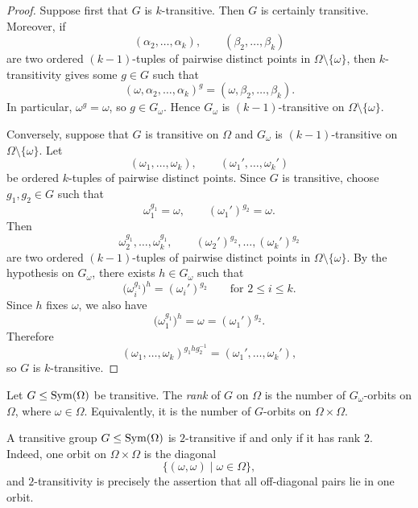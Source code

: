 \begin{proof}
Suppose first that \(G\) is \(k\)-transitive. Then \(G\) is certainly transitive.
Moreover, if
\[
    (\alpha_2,\ldots,\alpha_k),\qquad
    (\beta_2,\ldots,\beta_k)
\]
are two ordered \((k-1)\)-tuples of pairwise distinct points in
\(\Omega\setminus\{\omega\}\), then \(k\)-transitivity gives some \(g\in G\) such that
\[
    (\omega,\alpha_2,\ldots,\alpha_k)^g
    =
    (\omega,\beta_2,\ldots,\beta_k).
\]
In particular, \(\omega^g=\omega\), so \(g\in G_\omega\). Hence \(G_\omega\)
is \((k-1)\)-transitive on \(\Omega\setminus\{\omega\}\).

Conversely, suppose that \(G\) is transitive on \(\Omega\) and \(G_\omega\) is
\((k-1)\)-transitive on \(\Omega\setminus\{\omega\}\). Let
\[
    (\omega_1,\ldots,\omega_k),\qquad
    (\omega_1',\ldots,\omega_k')
\]
be ordered \(k\)-tuples of pairwise distinct points. Since \(G\) is transitive, choose
\(g_1,g_2\in G\) such that
\[
    \omega_1^{g_1}=\omega,\qquad
    (\omega_1')^{g_2}=\omega.
\]
Then
\[
    \omega_2^{g_1},\ldots,\omega_k^{g_1},
    \qquad
    (\omega_2')^{g_2},\ldots,(\omega_k')^{g_2}
\]
are two ordered \((k-1)\)-tuples of pairwise distinct points in
\(\Omega\setminus\{\omega\}\). By the hypothesis on \(G_\omega\), there exists
\(h\in G_\omega\) such that
\[
    \bigl(\omega_i^{g_1}\bigr)^h=(\omega_i')^{g_2}
    \qquad\text{for }2\leq i\leq k.
\]
Since \(h\) fixes \(\omega\), we also have
\[
    \bigl(\omega_1^{g_1}\bigr)^h=\omega=(\omega_1')^{g_2}.
\]
Therefore
\[
    (\omega_1,\ldots,\omega_k)^{g_1 h g_2^{-1}}
    =
    (\omega_1',\ldots,\omega_k'),
\]
so \(G\) is \(k\)-transitive.
\end{proof}

\begin{definition}
Let \(G\leq \operatorname{Sym}(\Omega)\) be transitive. The \emph{rank} of \(G\) on \(\Omega\)
is the number of \(G_\omega\)-orbits on \(\Omega\), where \(\omega\in \Omega\).
Equivalently, it is the number of \(G\)-orbits on \(\Omega\times\Omega\).
\end{definition}

\begin{remark}
A transitive group \(G\leq \operatorname{Sym}(\Omega)\) is \(2\)-transitive if and only if it has
rank \(2\). Indeed, one orbit on \(\Omega\times\Omega\) is the diagonal
\[
    \{(\omega,\omega)\mid \omega\in \Omega\},
\]
and \(2\)-transitivity is precisely the assertion that all off-diagonal pairs lie in
one orbit.
\end{remark}

